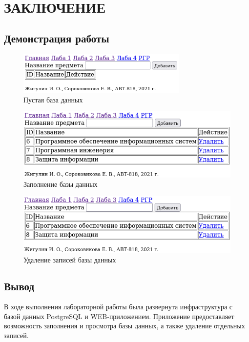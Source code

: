 \chapter{ЗАКЛЮЧЕНИЕ}

\section{Демонстрация работы}
\begin{figure}[H]
	\centering
	\includegraphics[width=0.75\textwidth]{01}
	\caption{Пустая база данных}
\end{figure}
\begin{figure}[H]
	\centering
	\includegraphics[width=\textwidth]{02}
	\caption{Заполнение базы данных}
\end{figure}
\begin{figure}[H]
	\centering
	\includegraphics[width=\textwidth]{03}
	\caption{Удаление записей базы данных}
\end{figure}

\section{Вывод}
В ходе выполнения лабораторной работы была развернута инфраструктура с базой данных PostgreSQL и WEB-приложением. Приложение предоставляет возможность заполнения и просмотра базы данных, а также удаление отдельных записей.